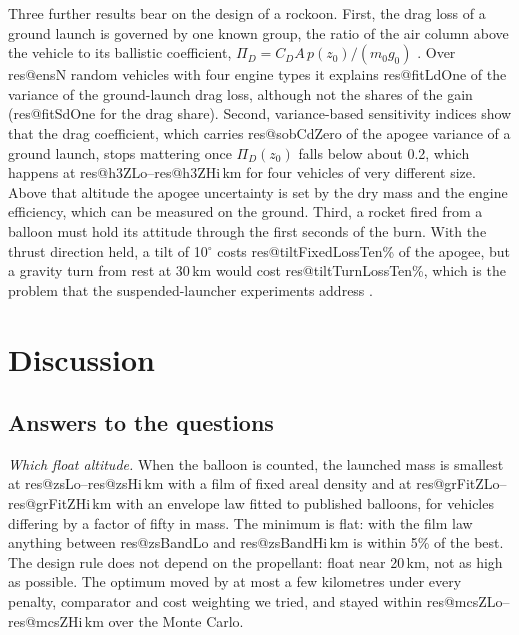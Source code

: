 \documentclass[11pt,a4paper]{article}
\makeatletter
\newcommand{\R}[1]{\csname res@#1\endcsname}
\makeatother
\begin{document}
Three further results bear on the design of a rockoon. First, the drag loss of a ground launch is governed by one known group, the ratio of the air column above the vehicle to its ballistic coefficient, $\Pi_D=C_DA\,p(z_0)/(m_0g_0)$ \cite{allen1958}. Over \R{ensN} random vehicles with four engine types it explains \R{fitLdOne} of the variance of the ground-launch drag loss, although not the shares of the gain (\R{fitSdOne} for the drag share). Second, variance-based sensitivity indices \cite{jansen1999,saltelli2010} show that the drag coefficient, which carries \R{sobCdZero} of the apogee variance of a ground launch, stops mattering once $\Pi_D(z_0)$ falls below about 0.2, which happens at \R{h3ZLo}--\R{h3ZHi}\,km for four vehicles of very different size. Above that altitude the apogee uncertainty is set by the dry mass and the engine efficiency, which can be measured on the ground. Third, a rocket fired from a balloon must hold its attitude through the first seconds of the burn. With the thrust direction held, a tilt of 10$^{\circ}$ costs \R{tiltFixedLossTen}\% of the apogee, but a gravity turn from rest at 30\,km would cost \R{tiltTurnLossTen}\%, which is the problem that the suspended-launcher experiments address \cite{shoyama2021,shoyama2026}.

\section{Discussion}

\subsection{Answers to the questions}

\emph{Which float altitude.} When the balloon is counted, the launched mass is smallest at \R{zsLo}--\R{zsHi}\,km with a film of fixed areal density and at \R{grFitZLo}--\R{grFitZHi}\,km with an envelope law fitted to published balloons, for vehicles differing by a factor of fifty in mass. The minimum is flat: with the film law anything between \R{zsBandLo} and \R{zsBandHi}\,km is within 5\% of the best. The design rule does not depend on the propellant: float near 20\,km, not as high as possible. The optimum moved by at most a few kilometres under every penalty, comparator and cost weighting we tried, and stayed within \R{mcsZLo}--\R{mcsZHi}\,km over the Monte Carlo.
\end{document}
